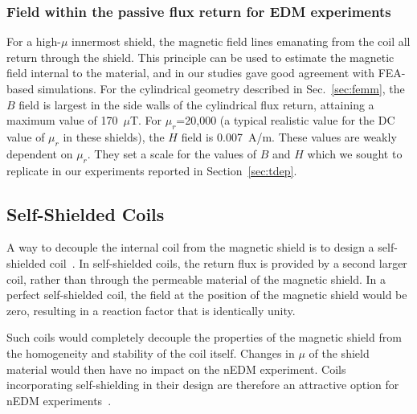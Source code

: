 \documentclass[review]{elsarticle}
\begin{document}
\subsubsection{Field within the passive flux return for EDM experiments}

For a high-$\mu$ innermost shield, the magnetic field lines emanating
from the coil all return through the shield.  This principle can be
used to estimate the magnetic field internal to the material, and in
our studies gave good agreement with FEA-based simulations.  For the
cylindrical geometry described in Sec.~\ref{sec:femm}, the $B$ field
is largest in the side walls of the cylindrical flux return, attaining
a maximum value of 170~$\mu$T.  For $\mu_r$=20,000 (a typical
realistic value for the DC value of $\mu_r$ in these shields), the $H$
field is 0.007~A/m.  These values are weakly dependent on $\mu_r$.
They set a scale for the values of $B$ and $H$ which we sought to
replicate in our experiments reported in Section~\ref{sec:tdep}.



\subsection{Self-Shielded Coils}

A way to decouple the internal coil from the magnetic shield is to
design a self-shielded
coil~\cite{bib:cpviolwithoutstrangeness,bib:someotherselfshieldedcoilpapers}.
In self-shielded coils, the return flux is provided by a second larger
coil, rather than through the permeable material of the magnetic
shield.  In a perfect self-shielded coil, the field at the position of
the magnetic shield would be zero, resulting in a reaction factor that
is identically unity.

Such coils would completely decouple the properties of the magnetic
shield from the homogeneity and stability of the coil itself.  Changes
in $\mu$ of the shield material would then have no impact on the nEDM
experiment.  Coils incorporating self-shielding in their design are
therefore an attractive option for nEDM
experiments~\cite{bib:cpviolwithoutstrangeness}.


\end{document}
